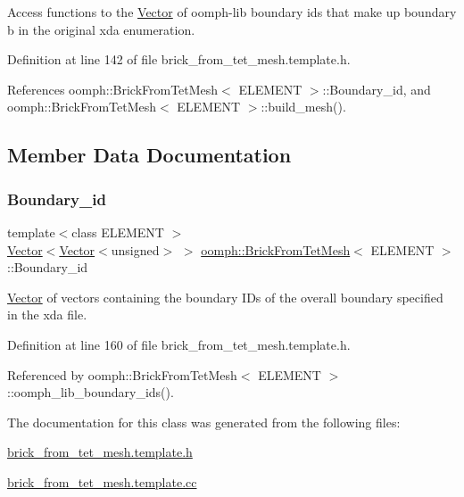 Access functions to the \hyperlink{classoomph_1_1Vector}{Vector} of oomph-\/lib boundary ids that make up boundary b in the original xda enumeration. 



Definition at line 142 of file brick\+\_\+from\+\_\+tet\+\_\+mesh.\+template.\+h.



References oomph\+::\+Brick\+From\+Tet\+Mesh$<$ E\+L\+E\+M\+E\+N\+T $>$\+::\+Boundary\+\_\+id, and oomph\+::\+Brick\+From\+Tet\+Mesh$<$ E\+L\+E\+M\+E\+N\+T $>$\+::build\+\_\+mesh().



\subsection{Member Data Documentation}
\mbox{\label{classoomph_1_1BrickFromTetMesh_a0f6a4b80993ee015038c36ff1aa5556f}} 
\subsubsection{\texorpdfstring{Boundary\+\_\+id}{Boundary\_id}}
{\footnotesize\ttfamily template$<$class E\+L\+E\+M\+E\+NT $>$ \\
\hyperlink{classoomph_1_1Vector}{Vector}$<$\hyperlink{classoomph_1_1Vector}{Vector}$<$unsigned$>$ $>$ \hyperlink{classoomph_1_1BrickFromTetMesh}{oomph\+::\+Brick\+From\+Tet\+Mesh}$<$ E\+L\+E\+M\+E\+NT $>$\+::Boundary\+\_\+id\hspace{0.3cm}{\ttfamily [private]}}



\hyperlink{classoomph_1_1Vector}{Vector} of vectors containing the boundary I\+Ds of the overall boundary specified in the xda file. 



Definition at line 160 of file brick\+\_\+from\+\_\+tet\+\_\+mesh.\+template.\+h.



Referenced by oomph\+::\+Brick\+From\+Tet\+Mesh$<$ E\+L\+E\+M\+E\+N\+T $>$\+::oomph\+\_\+lib\+\_\+boundary\+\_\+ids().



The documentation for this class was generated from the following files\+:\begin{DoxyCompactItemize}
\item 
\hyperlink{brick__from__tet__mesh_8template_8h}{brick\+\_\+from\+\_\+tet\+\_\+mesh.\+template.\+h}\item 
\hyperlink{brick__from__tet__mesh_8template_8cc}{brick\+\_\+from\+\_\+tet\+\_\+mesh.\+template.\+cc}\end{DoxyCompactItemize}
